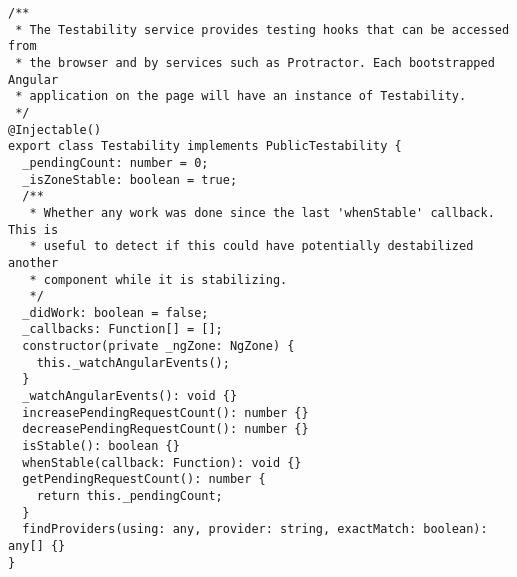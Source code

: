 \begin{verbatim}
/**
 * The Testability service provides testing hooks that can be accessed from
 * the browser and by services such as Protractor. Each bootstrapped Angular
 * application on the page will have an instance of Testability.
 */
@Injectable()
export class Testability implements PublicTestability {
  _pendingCount: number = 0;
  _isZoneStable: boolean = true;
  /**
   * Whether any work was done since the last 'whenStable' callback. This is
   * useful to detect if this could have potentially destabilized another
   * component while it is stabilizing.
   */
  _didWork: boolean = false;
  _callbacks: Function[] = [];
  constructor(private _ngZone: NgZone) {
    this._watchAngularEvents();
  }
  _watchAngularEvents(): void {}
  increasePendingRequestCount(): number {}
  decreasePendingRequestCount(): number {}
  isStable(): boolean {}
  whenStable(callback: Function): void {}
  getPendingRequestCount(): number {
    return this._pendingCount;
  }
  findProviders(using: any, provider: string, exactMatch: boolean): any[] {}
}
\end{verbatim}
